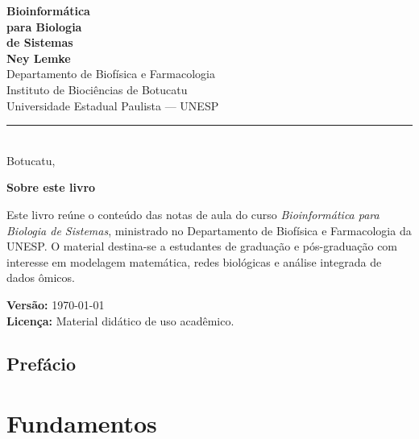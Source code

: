 \documentclass[12pt, a4paper, twoside, openright]{book}
\theoremstyle{definition}
\theoremstyle{plain}
\begin{document}
\begin{titlepage}
\begin{center}
  \vspace*{3cm}
  {\fontsize{34}{40}\selectfont\bfseries\color{azulescuro}
    Bioinform\'atica\\[0.4em]
    para Biologia\\[0.4em]
    de Sistemas}\\[2.5cm]
  {\LARGE\bfseries Ney Lemke}\\[0.8cm]
  {\large Departamento de Biof\'isica e Farmacologia\\[0.2cm]
    Instituto de Bioci\^encias de Botucatu\\[0.2cm]
    Universidade Estadual Paulista --- UNESP}\\[2.5cm]
  \color{azulescuro}\rule{0.5\textwidth}{1pt}\\[0.8cm]
  {\large Botucatu, \the\year}
\end{center}
\end{titlepage}

\thispagestyle{empty}
\vspace*{\fill}
\begin{center}
\begin{minipage}{0.78\textwidth}
{\small\textbf{Sobre este livro}

Este livro re\'une o conte\'udo das notas de aula do curso
\textit{Bioinform\'atica para Biologia de Sistemas},
ministrado no Departamento de Biof\'isica e Farmacologia da UNESP.
O material destina-se a estudantes de gradua\c{c}\~ao e p\'os-gradua\c{c}\~ao
com interesse em modelagem matem\'atica, redes biol\'ogicas e an\'alise
integrada de dados \^omicos.

\medskip
\textbf{Vers\~ao:} \today\\[0.2cm]
\textbf{Licen\c{c}a:} Material did\'atico de uso acad\^emico.}
\end{minipage}
\end{center}
\vspace*{\fill}
\clearpage

\frontmatter
\chapter*{Pref\'acio}

\tableofcontents

\mainmatter

\part{Fundamentos}



\end{document}
